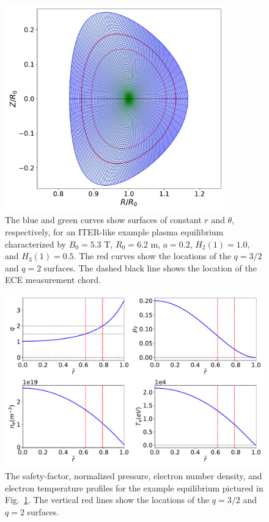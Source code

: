 \documentclass{iopjournal}
\begin{document}
\begin{figure}
\centerline{\includegraphics[width=0.85\textwidth]{Fig1.pdf}}
\caption{The blue and green curves show surfaces of constant $r$ and $\theta$, respectively, for an ITER-like example
plasma equilibrium characterized by $B_0=5.3$ T, $R_0=6.2$ m, $a=0.2$, $H_2(1)=1.0$, and $H_3(1)= 0.5$. The red curves show
the locations of the $q=3/2$ and $q=2$ surfaces.  The dashed black line shows the location of the ECE measurement chord. \label{figa}}
\end{figure}

\begin{figure}
\centerline{\includegraphics[width=1.0\textwidth]{Fig2.pdf}}
\caption{The safety-factor, normalized pressure, electron number density, and electron temperature profiles for the
example equilibrium pictured in Fig.~\ref{figa}. The vertical red lines show the locations of the $q=3/2$ and $q=2$
surfaces.   \label{figb}}
\end{figure}
\end{document}

